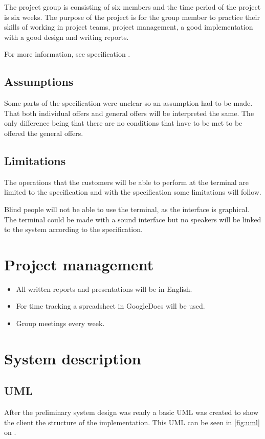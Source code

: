 \documentclass[a4paper,twoside,titlepage]{article}
\begin{document}
The project group is consisting of six members and the time period of the project is six weeks. The purpose of the project is for the group member to practice their skills of working in project teams, project management, a good implementation with a good design and writing reports. 

For more information, see specification \cite{spec}.
	\subsection{Assumptions}
		Some parts of the specification were unclear so an assumption had to be made.
		That both individual offers and general offers will be interpreted the same. The only difference being that there are no conditions that have to be met to be offered the general offers.
	\subsection{Limitations}\label{limitations}
		The operations that the customers will be able to perform at the terminal are limited to the specification and with the specification some limitations will follow.
 
		Blind people will not be able to use the terminal, as the interface is graphical. The terminal could be made with a sound interface but no speakers will be linked to the system according to the specification.

\section{Project management}
	\begin{itemize}
    \item All written reports and presentations will be in English.
    \item For time tracking a spreadsheet in GoogleDocs will be used.
    \item Group meetings every week.
	\end{itemize}

\section{System description}
	\subsection{UML}

		After the preliminary system design was ready a basic UML was created to show the client the structure of the implementation. This UML can be seen in \autoref{fig:uml} on \pagename{} \pageref{fig:uml}.
\end{document}
